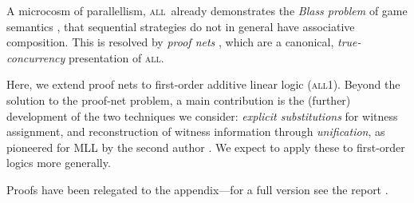 \documentclass[UKenglish]{lipics-v2019}
\newcommand\all{\textsc{all}}
\newcommand\+{+}
\renewcommand\*{\times}
\begin{document}
A microcosm of parallellism, \all\ already demonstrates the \emph{Blass problem} of game semantics \cite{Abramsky-2003}, that sequential strategies do not in general have associative composition. This is resolved by \emph{proof nets} \cite{Girard-1987,Hughes-vanGlabbeek-2005}, which are a canonical, \emph{true-concurrency} presentation of \all.

Here, we extend proof nets to first-order additive linear logic (\all1). Beyond the solution to the proof-net problem, a main contribution is the (further) development of the two techniques we consider: \emph{explicit substitutions} for witness assignment, and reconstruction of witness information through \emph{unification}, as pioneered for MLL by the second author \cite{Hughes-2018}. We expect to apply these to first-order logics more generally.

Proofs have been relegated to the appendix---for a full version see the report \cite{Heijltjes-Hughes-Strassburger-2018}.
\end{document}
